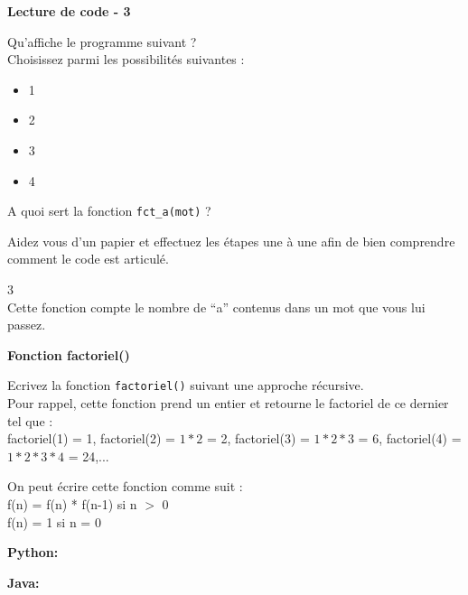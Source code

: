 	\begin{Exercice}[5 minutes] \textbf{Lecture de code - 3 \optionnel} 
	
	Qu'affiche le programme suivant ? \\ 
	
	  
	
	Choisissez parmi les possibilités suivantes :
	
	\begin{itemize}
	\item 1 \\
	\item 2 \\
	\item 3 \\
	\item 4 \\
	\end{itemize}
	
	A quoi sert la fonction \lstinline{fct_a(mot)} ? \\
	
		\begin{conseil} 
		Aidez vous d'un papier et effectuez les étapes une à une afin de bien comprendre comment le code est articulé.
		\end{conseil} 
	
		\begin{solution} 
		3 \\
		
		Cette fonction compte le nombre de ``a'' contenus dans un mot que vous lui passez.
	
		\end{solution} 
	
	\end{Exercice}
	
	\begin{Exercice}[10 minutes] \textbf{Fonction factoriel()} 
	
	Ecrivez la fonction \lstinline{factoriel()} suivant une approche récursive. \\ 
	
	Pour rappel, cette fonction prend un entier et retourne le factoriel de ce dernier tel que : \\
	
	factoriel(1) = 1, factoriel(2) = $1*2$ = 2, factoriel(3) = $1*2*3$ = 6, factoriel(4) = $1*2*3*4$ = 24,...
	  
	
		\begin{conseil} 
		On peut écrire cette fonction comme suit : \\
		
		f(n) = f(n) * f(n-1) si n $>$ 0 \\
		
		f(n) = 1 si n = 0
		
		\end{conseil} 
	
        \begin{solution} 
            \textbf{Python:}
            
            \textbf{Java:}
            
		\end{solution} 
	
	\end{Exercice}
	
